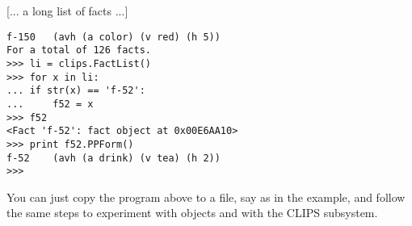 [... a long list of facts ...]

\begin{verbatim}
f-150   (avh (a color) (v red) (h 5))
For a total of 126 facts.
>>> li = clips.FactList()
>>> for x in li:
...	if str(x) == 'f-52':
...		f52 = x
>>> f52
<Fact 'f-52': fact object at 0x00E6AA10>
>>> print f52.PPForm()
f-52    (avh (a drink) (v tea) (h 2))
>>>
\end{verbatim}

You can just copy the program above to a file, say  as
in the example, and follow the same steps to experiment with \pyclips{}
objects and with the CLIPS subsystem.
